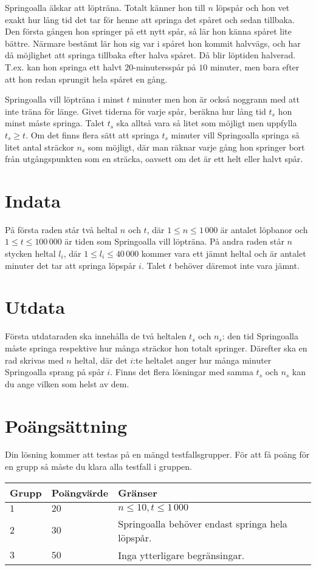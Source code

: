 Springoalla älskar att löpträna.
Totalt känner hon till $n$ löpspår och hon vet exakt hur lång tid det tar för henne att springa det spåret och sedan tillbaka.
Den första gången hon springer på ett nytt spår, så lär hon känna spåret lite bättre.
Närmare bestämt lär hon sig var i spåret hon kommit halvvägs, och har då möjlighet att springa tillbaka efter halva spåret.
Då blir löptiden halverad.
T.ex. kan hon springa ett halvt $20$-minutersspår på $10$ minuter, men bara efter att hon redan sprungit hela spåret en gång.

Springoalla vill löpträna i minst $t$ minuter men hon är också noggrann med att inte träna för länge.
Givet tiderna för varje spår, beräkna hur lång tid $t_s$ hon minst måste springa.
Talet $t_s$ ska alltså vara så litet som möjligt men uppfylla $t_s \ge t$.
Om det finns flera sätt att springa $t_s$ minuter vill Springoalla springa så litet antal sträckor $n_s$ som möjligt, där man räknar varje gång hon springer bort från utgångspunkten som en sträcka, oavsett om det är ett helt eller halvt spår.

\section*{Indata}
På första raden står två heltal $n$ och $t$, där $1 \le n \le 1\,000$ är antalet löpbanor och $1 \le t \le 100\,000$ är tiden som Springoalla vill löpträna.
På andra raden står $n$ stycken heltal $l_i$, där $1 \le l_i \le 40\,000$ kommer vara ett jämnt heltal och är antalet minuter det tar att springa löpspår $i$.
Talet $t$ behöver däremot inte vara jämnt.

\section*{Utdata}
Första utdataraden ska innehålla de två heltalen $t_s$ och $n_s$: den tid Springoalla måste springa respektive hur många sträckor hon totalt springer.
Därefter ska en rad skrivas med $n$ heltal, där det $i$:te heltalet anger hur många minuter Springoalla sprang på spår $i$.
Finns det flera lösningar med samma $t_s$ och $n_s$ kan du ange vilken som helst av dem.

\section*{Poängsättning}
Din lösning kommer att testas på en mängd testfallsgrupper.
För att få poäng för en grupp så måste du klara alla testfall i gruppen.

\noindent
\begin{tabular}{| l | l | p{12cm} |}
  \hline
  Grupp & Poängvärde & Gränser \\ \hline
  $1$    & $20$        & $n \le 10, t \le 1\,000$ \\ \hline 
  $2$    & $30$        & Springoalla behöver endast springa hela löpspår. \\ \hline
  $3$    & $50$        & Inga ytterligare begränsingar. \\ \hline 
\end{tabular}
